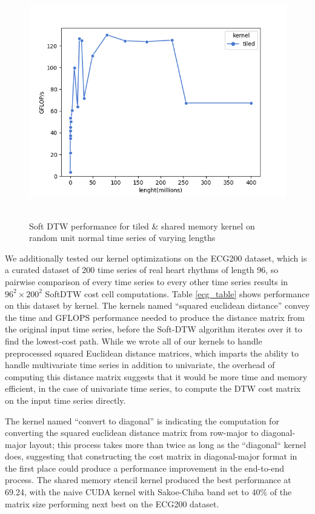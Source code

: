\documentclass[12pt, letterpaper]{article}
\begin{document}
\begin{figure}[htbp]
\includegraphics[height=4in]{fig/plot_tiled.png}
\centering
\caption{Soft DTW performance for tiled \& shared memory kernel on random unit
  normal time series of varying lengths}
\label{plot_tiled}
\end{figure}

We additionally tested our kernel optimizations on the ECG200 dataset, which is
a curated dataset of 200 time series of real heart rhythms of length 96, so
pairwise comparison of every time series to every other time series results in
$96^2 \times 200^2$ SoftDTW cost cell computations. Table \ref{ecg_table} shows
performance on this dataset by kernel. The kernels named ``squared euclidean
distance'' convey the time and GFLOPS performance needed to produce the distance
matrix from the original input time series, before the Soft-DTW algorithm
iterates over it to find the lowest-cost path. While we wrote all of our kernels
to handle preprocessed squared Euclidean distance matrices, which imparts the
ability to handle multivariate time series in addition to univariate, the
overhead of computing this distance matrix suggests that it would be more time
and memory efficient, in the case of univariate time series, to compute the DTW
cost matrix on the input time series directly.

The kernel named ``convert to diagonal'' is indicating the
computation for converting the squared euclidean distance matrix from row-major
to diagonal-major layout; this process takes more than twice as long as the
``diagonal`` kernel does, suggesting that constructing the cost matrix in
diagonal-major format in the first place could produce a performance improvement
in the end-to-end process. The shared memory stencil kernel produced the best
performance at 69.24, with the naive CUDA kernel with Sakoe-Chiba band set to
40\% of the matrix size performing next best on the ECG200 dataset.
\end{document}
